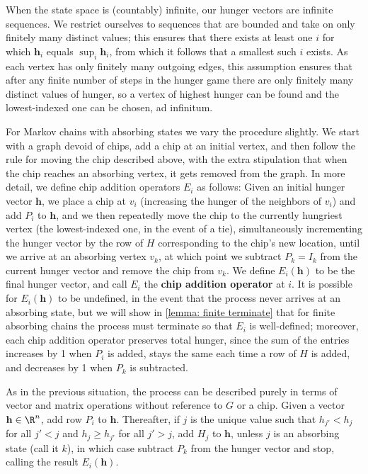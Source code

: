 When the state space is (countably) infinite, our hunger vectors
are infinite sequences.
We restrict ourselves to sequences that are bounded
and take on only finitely many distinct values;
this ensures that there exists at least one $i$
for which $\mathbf{h}_i$ equals $\sup_i \mathbf{h}_i$,
from which it follows that a smallest such $i$ exists.
As each vertex has only finitely many outgoing edges, 
this assumption ensures that after 
any finite number of steps in the hunger game 
there are only finitely many distinct values of hunger, 
so a vertex of highest hunger can be found
and the lowest-indexed one can be chosen, ad infinitum.

For Markov chains with absorbing states we vary the procedure slightly.
We start with a graph devoid of chips, add a chip at an initial vertex,
and then follow the rule for moving the chip described above,
with the extra stipulation that when the chip reaches 
an absorbing vertex, it gets removed from the graph.
In more detail, we define chip addition operators $E_i$ as follows:
Given an initial hunger vector $\mathbf{h}$, 
we place a chip at $v_i$ (increasing the hunger of the neighbors of $v_i$)
and add $P_i$ to $\mathbf{h}$,
and we then repeatedly move the chip to the currently hungriest vertex
(the lowest-indexed one, in the event of a tie),
simultaneously incrementing the hunger vector
by the row of $H$ corresponding to the chip's new location,
until we arrive at an absorbing vertex $v_k$,
at which point we subtract $P_k=I_k$ from the current hunger vector
and remove the chip from $v_k$.
We define $E_i(\mathbf{h})$ to be the final hunger vector,
and call $E_i$ the \textbf{chip addition operator} at $i$.
It is possible for $E_i(\mathbf{h})$ to be undefined,
in the event that the process never arrives at an absorbing state,
but we will show in \cref{lemma: finite terminate} 
that for finite absorbing chains 
the process must terminate so that $E_i$ is well-defined;
moreover, each chip addition operator preserves total hunger,
since the sum of the entries increases by 1 when $P_i$ is added,
stays the same each time a row of $H$ is added,
and decreases by 1 when $P_k$ is subtracted.

As in the previous situation, the process can be described
purely in terms of vector and matrix operations
without reference to $G$ or a chip.
Given a vector $\mathbf{h}\in\R^{n}$, add row $P_i$ to $\mathbf{h}$.
Thereafter, if $j$ is the unique value such that 
$h_{j'} < h_j$ for all $j' < j$ and $h_j \geq h_{j'}$ for all ${j'} > j$, 
add $H_j$ to $\mathbf{h}$,
unless $j$ is an absorbing state (call it $k$), in which case
subtract $P_k$ from the hunger vector and stop, 
calling the result $E_i(\mathbf{h})$.


